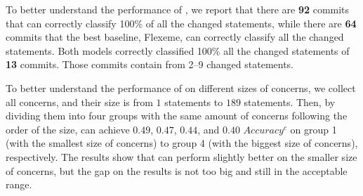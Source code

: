  To better understand the
performance of {\tool}, we report that there are {\bf 92} commits that
{\tool} can correctly classify 100\% of all the changed statements,
while there are {\bf 64} commits that the best baseline, Flexeme, can
correctly classify all the changed statements. Both models correctly
classified 100\% all the changed statements of {\bf 13} commits. 
Those commits contain from 2--9 changed statements.
       



To better understand the performance of \tool on different sizes of concerns, we collect all concerns, and their size is from $1$ statements to $189$ statements. Then, by dividing them into four groups with the same amount of concerns following the order of the size, \tool can achieve $0.49$, $0.47$, $0.44$, and $0.40$ $Accuracy^c$ on group 1 (with the smallest size of concerns) to group 4 (with the biggest size of concerns), respectively. The results show that \tool can perform slightly better on the smaller size of concerns, but the gap on the results is not too big and still in the acceptable range.
